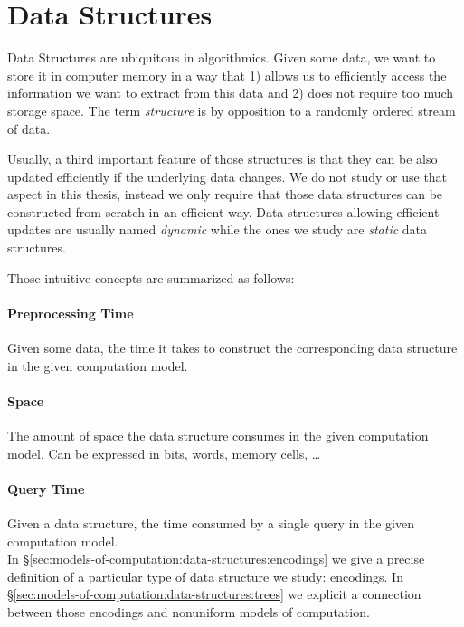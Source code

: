 \section{Data Structures}%
\label{sec:models-of-computation:data-structures}

Data Structures are ubiquitous in algorithmics. Given some data, we want to
store it in computer memory in a way that 1) allows us to efficiently access
the information we want to extract from this data and 2) does not require too
much storage space. The term \emph{structure} is by opposition to a randomly
ordered stream of data.

Usually, a third important feature of those structures is that they can be also
updated efficiently if the underlying data changes. We do not study or use that
aspect in this thesis, instead we only require that those data structures can
be constructed from scratch in an efficient way. Data
structures allowing efficient updates are usually named \emph{dynamic}
while the ones we study are \emph{static} data structures.

Those intuitive concepts are summarized as follows:

\paragraph{Preprocessing Time} Given some data, the time it takes to construct
the corresponding data structure in the given computation model.

\paragraph{Space} The amount of space the data structure consumes in the given
computation model. Can be expressed in bits, words, memory cells, \dots

\paragraph{Query Time} Given a data structure, the time consumed by a
single query in the given computation model.
\\

In \S\ref{sec:models-of-computation:data-structures:encodings} we give a precise
definition of a particular type of data structure we study: encodings.
In \S\ref{sec:models-of-computation:data-structures:trees} we explicit a
connection between those encodings and nonuniform models of computation.


